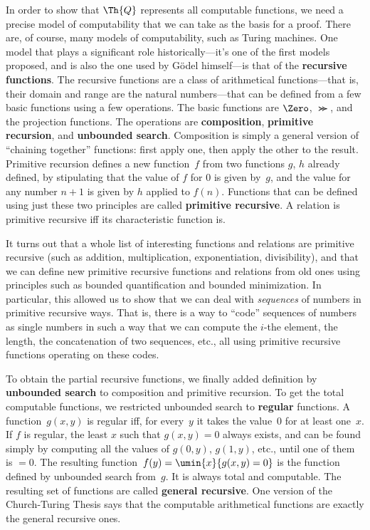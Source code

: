 In order to show that $\Th{Q}$ represents all computable functions, we
need a precise model of computability that we can take as the basis
for a proof.  There are, of course, many models of computability, such
as Turing machines. One model that plays a significant role
historically---it's one of the first models proposed, and is also the
one used by G\"odel himself---is that of the \textbf{recursive
functions}.  The recursive functions are a class of arithmetical
functions---that is, their domain and range are the natural
numbers---that can be defined from a few basic functions using a few
operations. The basic functions are $\Zero$, $\Succ$, and the
projection functions. The operations are \textbf{composition},
\textbf{primitive recursion}, and \textbf{unbounded search}.
Composition is simply a general version of ``chaining together''
functions: first apply one, then apply the other to the result.
Primitive recursion defines a new function~$f$ from two functions $g$,
$h$ already defined, by stipulating that the value of $f$ for $0$ is
given by~$g$, and the value for any number $n+1$ is given by $h$
applied to $f(n)$.  Functions that can be defined using just these two
principles are called \textbf{primitive recursive}. A relation is
primitive recursive iff its characteristic function is.

It turns out that a whole list of interesting functions and relations
are primitive recursive (such as addition, multiplication,
exponentiation, divisibility), and that we can define new primitive
recursive functions and relations from old ones using principles such
as bounded quantification and bounded minimization. In particular,
this allowed us to show that we can deal with \emph{sequences} of
numbers in primitive recursive ways. That is, there is a way to
``code'' sequences of numbers as single numbers in such a way that we
can compute the $i$-the element, the length, the concatenation of two
sequences, etc., all using primitive recursive functions operating on
these codes.

To obtain the partial recursive functions, we finally added
definition by \textbf{unbounded search} to composition and primitive
recursion. To get the total computable functions, we restricted
unbounded search to \textbf{regular} functions. A function~$g(x, y)$
is regular iff, for every~$y$ it takes the value~$0$ for at least
one~$x$. If $f$ is regular, the least $x$ such that $g(x, y) = 0$
always exists, and can be found simply by computing all the values of
$g(0, y)$, $g(1, y)$, etc., until one of them is $= 0$. The resulting
function~$f(y) = \umin{x}{g(x, y) = 0}$ is the function defined by
unbounded search from~$g$. It is always total and computable. The
resulting set of functions are called \textbf{general recursive}. One
version of the Church-Turing Thesis says that the computable
arithmetical functions are exactly the general recursive ones.
